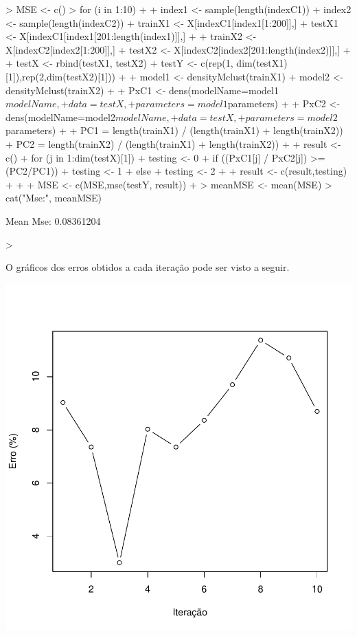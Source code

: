 \documentclass[12pt,a4paper,titlepage]{article}
\begin{document}
\begin{Schunk}
\begin{Sinput}
> MSE <- c()
> for (i in 1:10) {
+     
+     index1 <- sample(length(indexC1))
+     index2 <- sample(length(indexC2))
+     trainX1 <- X[indexC1[index1[1:200]],]
+     testX1 <- X[indexC1[index1[201:length(index1)]],]
+     
+     trainX2 <- X[indexC2[index2[1:200]],]
+     testX2 <- X[indexC2[index2[201:length(index2)]],]
+     
+     testX <- rbind(testX1, testX2)
+     testY <- c(rep(1, dim(testX1)[1]),rep(2,dim(testX2)[1]))
+     
+     model1 <- densityMclust(trainX1)
+     model2 <- densityMclust(trainX2)
+     
+     PxC1 <- dens(modelName=model1$modelName, 
+                  data = testX, 
+                  parameters = model1$parameters)
+     
+     PxC2 <- dens(modelName=model2$modelName, 
+                  data = testX, 
+                  parameters = model2$parameters)
+     
+     PC1 = length(trainX1) / (length(trainX1) + length(trainX2))
+     PC2 = length(trainX2) / (length(trainX1) + length(trainX2))
+     
+     result <- c()
+     for (j in 1:dim(testX)[1]) {
+         testing <- 0
+         if ((PxC1[j] / PxC2[j]) >= (PC2/PC1)) {
+             testing <- 1
+         } else {
+             testing <- 2
+         }
+        result <- c(result,testing) 
+     }
+     
+     MSE <- c(MSE,mse(testY, result))
+ }
> meanMSE <- mean(MSE)
> cat("\nMean Mse:", meanMSE)
\end{Sinput}
\begin{Soutput}
Mean Mse: 0.08361204
\end{Soutput}
\begin{Sinput}
> 
\end{Sinput}
\end{Schunk}

O gráficos dos erros obtidos a cada iteração pode ser visto a seguir.

\includegraphics{exercicio6-004}
\end{document}

